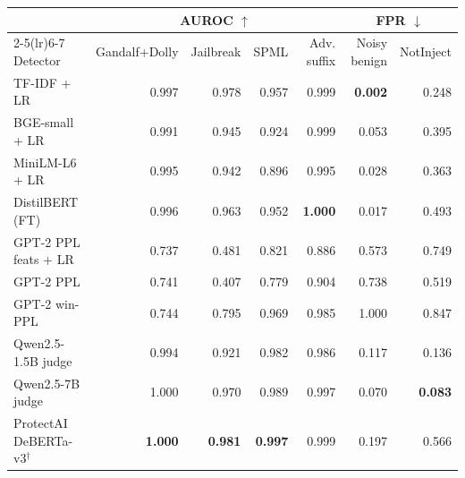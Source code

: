 \begin{tabular}{lrrrrrr}
\toprule
 & \multicolumn{4}{c}{AUROC $\uparrow$} & \multicolumn{2}{c}{FPR $\downarrow$} \\
\cmidrule(lr){2-5}\cmidrule(lr){6-7}
Detector & Gandalf+Dolly & Jailbreak & SPML & Adv. suffix & Noisy benign & NotInject \\
\midrule
TF-IDF + LR & 0.997 & 0.978 & 0.957 & 0.999 & \textbf{0.002} & 0.248 \\
\midrule
BGE-small + LR & 0.991 & 0.945 & 0.924 & 0.999 & 0.053 & 0.395 \\
MiniLM-L6 + LR & 0.995 & 0.942 & 0.896 & 0.995 & 0.028 & 0.363 \\
\midrule
DistilBERT (FT) & 0.996 & 0.963 & 0.952 & \textbf{1.000} & 0.017 & 0.493 \\
\midrule
GPT-2 PPL feats + LR & 0.737 & 0.481 & 0.821 & 0.886 & 0.573 & 0.749 \\
GPT-2 PPL & 0.741 & 0.407 & 0.779 & 0.904 & 0.738 & 0.519 \\
GPT-2 win-PPL & 0.744 & 0.795 & 0.969 & 0.985 & 1.000 & 0.847 \\
\midrule
Qwen2.5-1.5B judge & 0.994 & 0.921 & 0.982 & 0.986 & 0.117 & 0.136 \\
Qwen2.5-7B judge & 1.000 & 0.970 & 0.989 & 0.997 & 0.070 & \textbf{0.083} \\
\midrule
ProtectAI DeBERTa-v3$^\dagger$ & \textbf{1.000} & \textbf{0.981} & \textbf{0.997} & 0.999 & 0.197 & 0.566 \\
\bottomrule
\end{tabular}